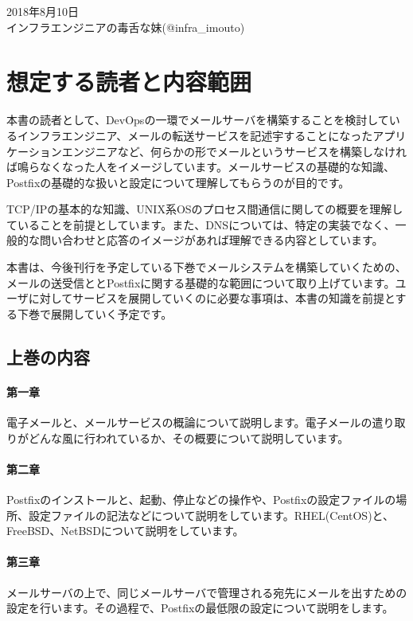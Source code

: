 \begin{flushright}
2018年8月10日 \\
インフラエンジニアの毒舌な妹(@infra\_imouto)
\end{flushright}

\section*{想定する読者と内容範囲}
本書の読者として、DevOpsの一環でメールサーバを構築することを検討しているインフラエンジニア、メールの転送サービスを記述宇することになったアプリケーションエンジニアなど、何らかの形でメールというサービスを構築しなければ鳴らなくなった人をイメージしています。メールサービスの基礎的な知識、Postfixの基礎的な扱いと設定について理解してもらうのが目的です。

TCP/IPの基本的な知識、UNIX系OSのプロセス間通信に関しての概要を理解していることを前提としています。また、DNSについては、特定の実装でなく、一般的な問い合わせと応答のイメージがあれば理解できる内容としています。

本書は、今後刊行を予定している下巻でメールシステムを構築していくための、メールの送受信ととPostfixに関する基礎的な範囲について取り上げています。ユーザに対してサービスを展開していくのに必要な事項は、本書の知識を前提とする下巻で展開していく予定です。

\subsection*{上巻の内容}

\paragraph{第一章}
電子メールと、メールサービスの概論について説明します。電子メールの遣り取りがどんな風に行われているか、その概要について説明しています。

\paragraph{第二章}
Postfixのインストールと、起動、停止などの操作や、Postfixの設定ファイルの場所、設定ファイルの記法などについて説明をしています。RHEL(CentOS)と、FreeBSD、NetBSDについて説明をしています。

\paragraph{第三章}
メールサーバの上で、同じメールサーバで管理される宛先にメールを出すための設定を行います。その過程で、Postfixの最低限の設定について説明をします。

